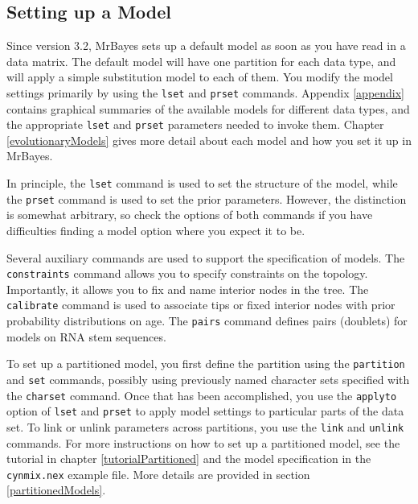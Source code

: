 \documentclass[12pt]{book}
\newcommand{\ttt}[1]{\texttt{#1} }
\begin{document}
\subsection{Setting up a Model}

Since version 3.2, MrBayes sets up a default model as soon as you have read in a data matrix. The
default model will have one partition for each data type, and will apply a simple substitution
model to each of them.  You modify the model settings primarily by using the \ttt{lset} and
\ttt{prset} commands. Appendix \ref{appendix} contains graphical summaries of the available models
for different data types, and the appropriate \ttt{lset} and \ttt{prset} parameters needed to
invoke them. Chapter \ref{evolutionaryModels} gives more detail about each model and how you set it
up in MrBayes.

In principle, the \ttt{lset} command is used to set the structure of the model, while the
\ttt{prset} command is used to set the prior parameters. However, the distinction is somewhat
arbitrary, so check the options of both commands if you have difficulties finding a model option
where you expect it to be.

Several auxiliary commands are used to support the specification of models. The \ttt{constraints}
command allows you to specify constraints on the topology. Importantly, it allows you to fix and
name interior nodes in the tree.  The \ttt{calibrate} command is used to associate tips or fixed
interior nodes with prior probability distributions on age. The \ttt{pairs} command defines pairs
(doublets) for models on RNA stem sequences.

To set up a partitioned model, you first define the partition using the \ttt{partition} and
\ttt{set} commands, possibly using previously named character sets specified with the \ttt{charset}
command. Once that has been accomplished, you use the \ttt{applyto} option of \ttt{lset} and
\ttt{prset} to apply model settings to particular parts of the data set. To link or unlink
parameters across partitions, you use the \ttt{link} and \ttt{unlink} commands. For more
instructions on how to set up a partitioned model, see the tutorial in chapter
\ref{tutorialPartitioned} and the model specification in the \ttt{cynmix.nex} example file. More
details are provided in section \ref{partitionedModels}.
\end{document}
